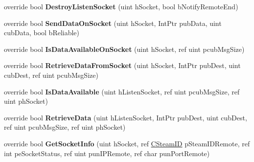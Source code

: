 \begin{DoxyCompactItemize}
\item 
\mbox{\label{class_valve_1_1_steamworks_1_1_c_steam_networking_aa498dfc539301fc83cf70a7bb1bc3a42}} 
override bool {\bfseries Destroy\+Listen\+Socket} (uint h\+Socket, bool b\+Notify\+Remote\+End)
\item 
\mbox{\label{class_valve_1_1_steamworks_1_1_c_steam_networking_a3d5809784f21a706db8e9e2eeb4e5d81}} 
override bool {\bfseries Send\+Data\+On\+Socket} (uint h\+Socket, Int\+Ptr pub\+Data, uint cub\+Data, bool b\+Reliable)
\item 
\mbox{\label{class_valve_1_1_steamworks_1_1_c_steam_networking_a0369d43036ae46c27165eff84fa0ec80}} 
override bool {\bfseries Is\+Data\+Available\+On\+Socket} (uint h\+Socket, ref uint pcub\+Msg\+Size)
\item 
\mbox{\label{class_valve_1_1_steamworks_1_1_c_steam_networking_a0927fdb86487028128c3cd74f0cab953}} 
override bool {\bfseries Retrieve\+Data\+From\+Socket} (uint h\+Socket, Int\+Ptr pub\+Dest, uint cub\+Dest, ref uint pcub\+Msg\+Size)
\item 
\mbox{\label{class_valve_1_1_steamworks_1_1_c_steam_networking_a1c724d50f6d78eed3e73647ada3d56b7}} 
override bool {\bfseries Is\+Data\+Available} (uint h\+Listen\+Socket, ref uint pcub\+Msg\+Size, ref uint ph\+Socket)
\item 
\mbox{\label{class_valve_1_1_steamworks_1_1_c_steam_networking_a60f46b66b241df5a0b47353f07bf92d7}} 
override bool {\bfseries Retrieve\+Data} (uint h\+Listen\+Socket, Int\+Ptr pub\+Dest, uint cub\+Dest, ref uint pcub\+Msg\+Size, ref uint ph\+Socket)
\item 
\mbox{\label{class_valve_1_1_steamworks_1_1_c_steam_networking_a06851931faa457e131bb1aabab41a237}} 
override bool {\bfseries Get\+Socket\+Info} (uint h\+Socket, ref \hyperlink{struct_valve_1_1_steamworks_1_1_c_steam_i_d}{C\+Steam\+ID} p\+Steam\+I\+D\+Remote, ref int pe\+Socket\+Status, ref uint pun\+I\+P\+Remote, ref char pun\+Port\+Remote)

\end{DoxyCompactItemize}

